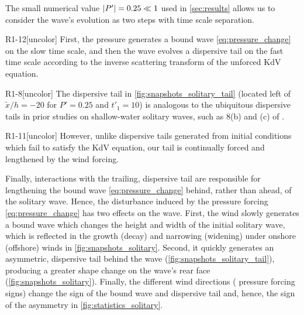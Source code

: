 \documentclass{jfm}
\begin{document}
The small numerical value $\abs{P'} = 0.25 \ll 1$ used in
\cref{sec:results} allows us to consider the wave's evolution as two
steps with time scale separation.
\begin{LineLabel}{R1-12}[uncolor]
First, the pressure generates a bound wave \cref{eq:pressure_change} on
the slow time scale, and then the wave evolves a dispersive tail on the
fast time scale according to the inverse scattering transform of the
unforced KdV equation.
\end{LineLabel}
\begin{LineLabel}{R1-8}[uncolor]
The dispersive tail in \cref{fig:snapshots_solitary_tail} (\eg located
left of $\tilde{x}/h=-20$ for $P'=0.25$ and $t'_1=10$) is analogous to the
ubiquitous dispersive tails in prior studies on shallow-water solitary
waves, such as \figsname{} 8(b) and (c) of \citet{hammack1974korteweg}.
\end{LineLabel}
\begin{LineLabel}{R1-11}[uncolor]
However, unlike dispersive tails generated from initial conditions which
fail to satisfy the KdV equation, our tail is continually forced and
lengthened by the wind forcing.
\end{LineLabel}
Finally, interactions with the trailing, dispersive tail are responsible
for lengthening the bound wave \cref{eq:pressure_change} behind, rather
than ahead, of the solitary wave.
Hence, the disturbance induced by the pressure forcing
\cref{eq:pressure_change} has two effects on the wave.
First, the wind slowly generates a bound wave which changes the height
and width of the initial solitary wave, which is reflected in the growth
(decay) and narrowing (widening) under onshore (offshore) winds in
\cref{fig:snapshots_solitary}.
Second, it quickly generates an asymmetric, dispersive tail behind the
wave (\cref{fig:snapshots_solitary_tail}), producing a greater shape
change on the wave's rear face (\cref{fig:snapshots_solitary}).
Finally, the different wind directions (\ie{} pressure forcing signs)
change the sign of the bound wave and dispersive tail and, hence, the
sign of the asymmetry in \cref{fig:statistics_solitary}.
\end{document}
